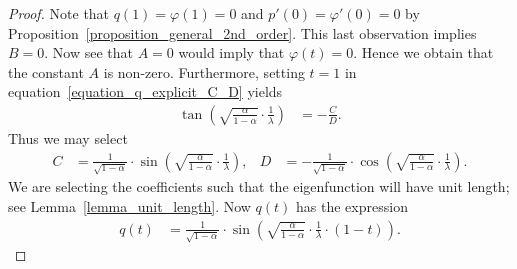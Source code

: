 \documentclass[10pt,a4paper]{amsart}
\begin{document}
\begin{proof}
Note that $q(1) = \varphi(1) = 0$
and $p'(0) = \varphi'(0) = 0$
by
Proposition~\ref{proposition_general_2nd_order}.
This last observation implies $B=0$.
Now see that $A = 0$
would imply that $\varphi(t) = 0$.
Hence we obtain that the constant $A$ is non-zero.
Furthermore, setting $t=1$ in
equation~\eqref{equation_q_explicit_C_D}
yields
\begin{align*}
\tan\left( \sqrt{\frac{\alpha}{1-\alpha}} \cdot \frac{1}{\lambda} \right)
& =
- \frac{C}{D} .
\end{align*}
Thus we may select
\begin{align*}
C
& =
\frac{1}{\sqrt{1-\alpha}}
\cdot
\sin\left( \sqrt{\frac{\alpha}{1-\alpha}} \cdot \frac{1}{\lambda} \right),
&
D
& =
- \frac{1}{\sqrt{1-\alpha}}
\cdot
\cos\left( \sqrt{\frac{\alpha}{1-\alpha}} \cdot \frac{1}{\lambda} \right) .
\end{align*}
We are selecting the coefficients such that the eigenfunction will have
unit length; see Lemma~\ref{lemma_unit_length}.
Now $q(t)$ has the expression
\begin{align}
q(t)
& =
\frac{1}{\sqrt{1-\alpha}}
\cdot
\sin\left( \sqrt{\frac{\alpha}{1-\alpha}} \cdot \frac{1}{\lambda} \cdot (1-t) \right) .
\label{equation_q_explicit_again}
\end{align}



\end{proof}
\end{document}
